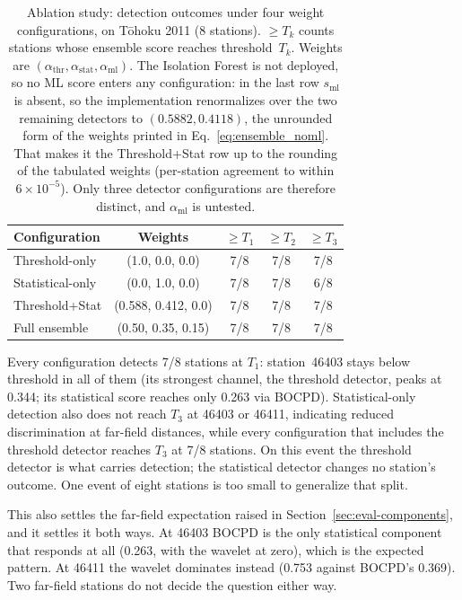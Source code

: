 \documentclass{article}
\begin{document}
\begin{table}[!htb]
\centering
\caption{Ablation study: detection outcomes under four weight
  configurations, on T\={o}hoku 2011 (8 stations).  $\ge T_k$ counts
  stations whose ensemble score reaches threshold~$T_k$.  Weights are
  $(\alpha_{\text{thr}},\alpha_{\text{stat}},\alpha_{\text{ml}})$.
  The Isolation Forest is not deployed, so no ML score enters any
  configuration: in the last row $s_{\text{ml}}$ is absent, so the
  implementation renormalizes over the two remaining detectors to
  $(0.5882, 0.4118)$, the unrounded form of the weights printed in
  Eq.~\ref{eq:ensemble_noml}.  That makes it the Threshold+Stat row up to
  the rounding of the tabulated weights (per-station agreement to within
  $6\times10^{-5}$).  Only three detector configurations are
  therefore distinct, and $\alpha_{\text{ml}}$ is untested.}
\label{tab:ablation}
\small
\begin{tabular}{lcccc}
\toprule
\textbf{Configuration} & \textbf{Weights}
  & $\ge T_1$ & $\ge T_2$ & $\ge T_3$ \\
\midrule
Threshold-only & (1.0, 0.0, 0.0) & 7/8 & 7/8 & 7/8 \\
Statistical-only & (0.0, 1.0, 0.0) & 7/8 & 7/8 & 6/8 \\
Threshold+Stat & (0.588, 0.412, 0.0) & 7/8 & 7/8 & 7/8 \\
Full ensemble & (0.50, 0.35, 0.15) & 7/8 & 7/8 & 7/8 \\
\bottomrule
\end{tabular}
\end{table}

Every configuration detects 7/8 stations at $T_1$: station~46403
stays below threshold in all of them (its strongest channel, the
threshold detector, peaks at 0.344; its statistical score reaches
only 0.263 via BOCPD).
Statistical-only detection also does not reach $T_3$ at 46403 or
46411, indicating reduced discrimination at far-field distances,
while every configuration that includes the threshold detector
reaches $T_3$ at 7/8 stations.  On this event the threshold
detector is what carries detection; the statistical detector changes
no station's outcome.  One event of eight stations is too small to
generalize that split.

This also settles the far-field expectation raised in
Section~\ref{sec:eval-components}, and it settles it both ways.  At
46403 BOCPD is the only statistical component that responds at all
(0.263, with the wavelet at zero), which is the expected pattern.  At
46411 the wavelet dominates instead (0.753 against BOCPD's 0.369).
Two far-field stations do not decide the question either way.
\end{document}
